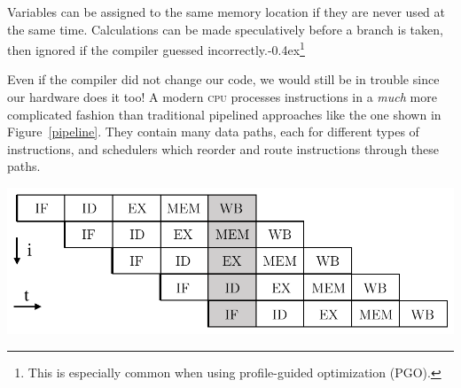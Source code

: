 \documentclass[fontsize=10pt, oneside]{scrartcl}
\newcommand{\punckern}{\kern-0.4ex}
\newcommand{\cplusplus}[1]{C\kern-0.1ex\raisebox{0.15ex}{\texttt{++}}{\addfontfeature{Numbers=LowercaseOff}#1}}
\newcommand{\fig}[1]{Figure~\ref{#1}}
\newenvironment{colfigure}
  {\par\vspace{1\baselineskip minus 0.5\baselineskip}\noindent\minipage{\linewidth}}
  {\endminipage\vspace{1\baselineskip minus 0.7\baselineskip}}
\begin{document}
Variables can be assigned to the same memory location if they are never used at the same time.
Calculations can be made speculatively before a branch is taken,
then ignored if the compiler guessed incorrectly.\punckern\footnote{%
This is especially common when using profile-guided optimization (PGO).}

Even if the compiler did not change our code,
we would still be in trouble since our hardware does it too!
A modern \textsc{cpu} processes instructions in a \emph{much} more complicated fashion than traditional pipelined approaches like the one shown in \fig{pipeline}.
They contain many data paths, each for different types of instructions,
and schedulers which reorder and route instructions through these paths.
\begin{colfigure}
  \centering
  \includegraphics[keepaspectratio,width=0.7\linewidth]{images/pipeline}
  \label{pipeline}
\end{colfigure}
\end{document}
